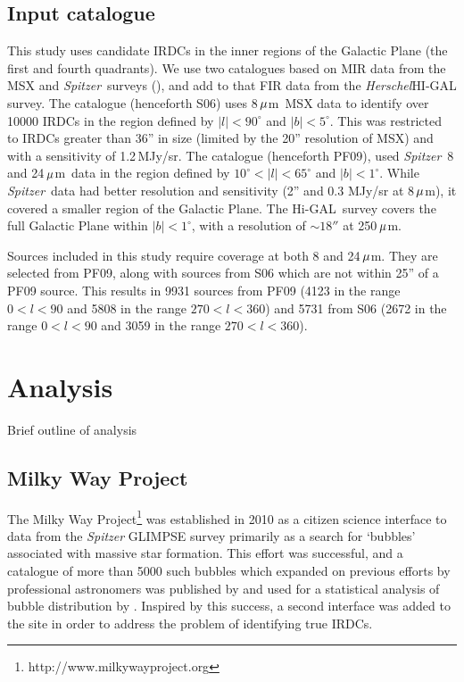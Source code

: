 \documentclass[a4,useAMS,usenatbib]{mn2e}
\def\herschel{{\em Herschel}}
\def\higal{Hi-GAL}
\def\spitzer{{\em Spitzer}}
\def\mic{$\umu$m}
\begin{document}
\subsection{Input catalogue}
This study uses candidate IRDCs in the inner regions of the Galactic
Plane (the first and fourth quadrants). We use two catalogues based on
MIR data from the MSX and \spitzer\ surveys (\citet{Simon06,PF09}),
and add to that FIR data from the \herschel HI-GAL survey. The
\citet{Simon06} catalogue (henceforth S06) uses 8\,\mic\ MSX data to
identify over 10000 IRDCs in the region defined by $|l| < 90^{\circ}$
and $|b|<5^{\circ}$. This was restricted to IRDCs greater than 36'' in
size (limited by the 20'' resolution of MSX) and with a sensitivity of
1.2\,MJy/sr. The \citet{PF09} catalogue (henceforth PF09), used
\spitzer\ 8 and 24\,\mic\ data in the region defined by $10^{\circ} <
|l| < 65^{\circ}$ and $|b|<1^{\circ}$. While \spitzer\ data had better
resolution and sensitivity (2'' and 0.3 MJy/sr at 8\,\mic), it covered
a smaller region of the Galactic Plane. The \higal\ survey covers the
full Galactic Plane within $|b|<1^{\circ}$, with a resolution of
$\sim18''$ at 250\,\mic.

Sources included in this study require coverage at both 8 and
24\,\mic. They are selected from PF09, along with sources from S06
which are not within 25'' of a PF09 source. This results in 9931
sources from PF09 (4123 in the range $0 < l < 90$ and 5808 in the
range $270 < l < 360$) and 5731 from S06 (2672 in the range $0 < l <
90$ and 3059 in the range $270 < l < 360$).

\section{Analysis}
Brief outline of analysis

\subsection{Milky Way Project}
The Milky Way Project\footnote{http://www.milkywayproject.org} was established in 2010 as a citizen science interface to data from the \emph{Spitzer} GLIMPSE survey primarily as a search for `bubbles' associated with massive star formation. This effort was successful, and a catalogue of more than 5000 such bubbles which expanded on previous efforts by professional astronomers was published by \citet{Simpsonetal} and used for a statistical analysis of bubble distribution by \citet{Kendrewetal}. Inspired by this success, a second interface was added to the site in order to address the problem of identifying true IRDCs.
\end{document}
